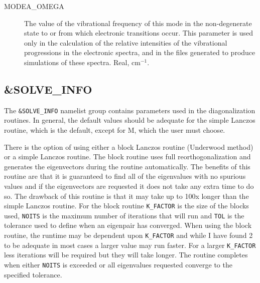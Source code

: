 \documentclass{article}
\newcommand{\wn}{cm$^{-1}$}
\begin{document}
\begin{description}
\item[MODEA\_OMEGA] The value of the vibrational frequency of this
  mode in the non-degenerate state to or from which electronic
  transitions occur. This parameter is used only in the calculation of
  the relative intensities of the vibrational progressions in the
  electronic spectra, and in the files generated to produce
  simulations of these spectra. Real, \wn .


\end{description}

\subsection{\&SOLVE\_INFO}

The {\tt \&SOLVE\_INFO} namelist group contains parameters used in the
diagonalization routines. In general, the default values should be
adequate for the simple Lanczos routine, which is the default, except for M,
which the user must choose. 

There is the option of using either a block Lanczos routine (Underwood method) or a simple Lanczos routine. The block routine
uses full reorthogonalization and generates the eigenvectors during the routine
automatically. The benefits of this routine are that it is guaranteed to find all
of the eigenvalues with no spurious values and if the eigenvectors are requested
it does not take any extra time to do so.  The drawback of this routine is that it
may take up to 100x longer than the simple Lanczos routine. For the block routine
{\tt K\_FACTOR} is the size of the blocks used, {\tt NOITS} is the maximum number of iterations
that will run and {\tt TOL} is the tolerance used to define when an eigenpair has converged.
When using the block routine, the runtime may be dependent upon {\tt K\_FACTOR} and while
I have found 2 to be adequate in most cases a larger value may run faster.  For a 
larger {\tt K\_FACTOR} less iterations will be required but they will take longer.  The routine
completes when either {\tt NOITS} is exceeded or all eigenvalues requested converge to the 
specified tolerance.
\end{document}
